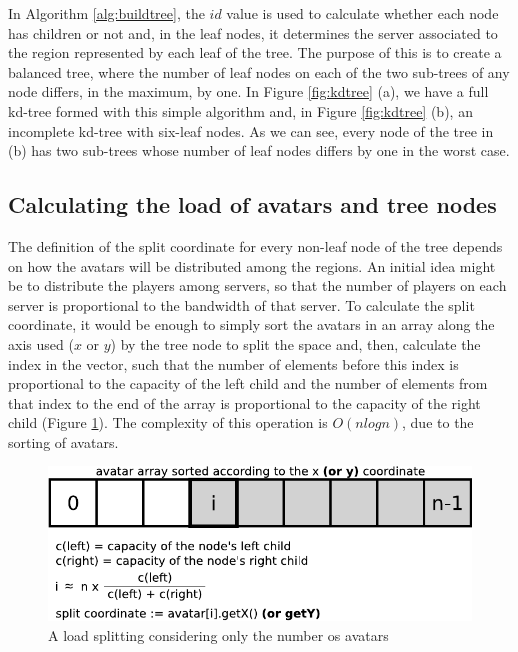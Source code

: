 In Algorithm \ref{alg:buildtree}, the $id$ value is used to calculate whether each node has children or not and, in the leaf nodes, it determines the server associated to the region represented by each leaf of the tree. The purpose of this is to create a balanced tree, where the number of leaf nodes on each of the two sub-trees of any node differs, in the maximum, by one. In Figure \ref{fig:kdtree} (a), we have a full kd-tree formed with this simple algorithm and, in Figure \ref{fig:kdtree} (b), an incomplete kd-tree with six-leaf nodes. As we can see, every node of the tree in (b) has two sub-trees whose number of leaf nodes differs by one in the worst case.

\subsection{Calculating the load of avatars and tree nodes}

The definition of the split coordinate for every non-leaf node of the tree depends on how the avatars will be distributed among the regions. An initial idea might be to distribute the players among servers, so that the number of players on each server is proportional to the bandwidth of that server. To calculate the split coordinate, it would be enough to simply sort the avatars in an array along the axis used ($x$ or $y$) by the tree node to split the space and, then, calculate the index in the vector, such that the number of elements before this index is proportional to the capacity of the left child and the number of elements from that index to the end of the array is proportional to the capacity of the right child (Figure \ref{fig:vector}). The complexity of this operation is $O(nlogn)$, due to the sorting of avatars.

\begin{figure}
  \centering
  \includegraphics[width=\linewidth]{images/vector}
  \caption{A load splitting considering only the number os avatars}
  \label{fig:vector}
\end{figure}

